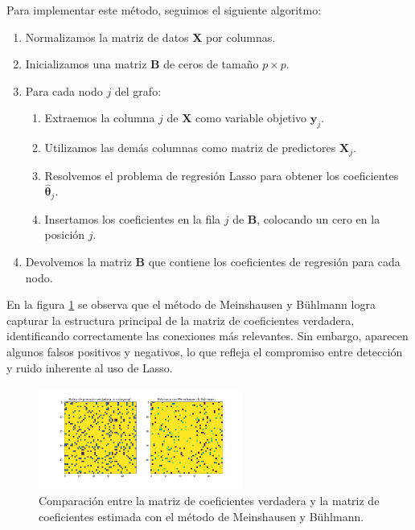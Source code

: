 \documentclass{article}
\begin{document}
Para implementar este método, seguimos el siguiente algoritmo:
\begin{enumerate}
    \item Normalizamos la matriz de datos $\mathbf{X}$ por columnas.
    \item Inicializamos una matriz $\mathbf{B}$ de ceros de tamaño $p \times p$.
    \item Para cada nodo $j$ del grafo:
    \begin{enumerate}
        \item Extraemos la columna $j$ de $\mathbf{X}$ como variable objetivo $\mathbf{y}_j$.
        \item Utilizamos las demás columnas como matriz de predictores $\mathbf{X}_j$.
        \item Resolvemos el problema de regresión Lasso para obtener los coeficientes $\hat{\boldsymbol{\theta}}_j$.
        \item Insertamos los coeficientes en la fila $j$ de $\mathbf{B}$, colocando un cero en la posición $j$.
    \end{enumerate}
    \item Devolvemos la matriz $\mathbf{B}$ que contiene los coeficientes de regresión para cada nodo.
\end{enumerate}

En la figura \ref{fig: meinhausen} se observa que el método de Meinshausen y Bühlmann logra capturar la estructura principal de la matriz de coeficientes verdadera, identificando correctamente las conexiones más relevantes. Sin embargo, aparecen algunos falsos positivos y negativos, lo que refleja el compromiso entre detección y ruido inherente al uso de Lasso.

\begin{figure}[htb]
    \centering
    \includegraphics[width=0.6\textwidth]{imagenes/meinhausen/matriz_estimada.png}
    \caption{Comparación entre la matriz de coeficientes verdadera y la matriz de coeficientes estimada con el método de Meinshausen y Bühlmann.}
    \label{fig: meinhausen}
\end{figure}
\end{document}
